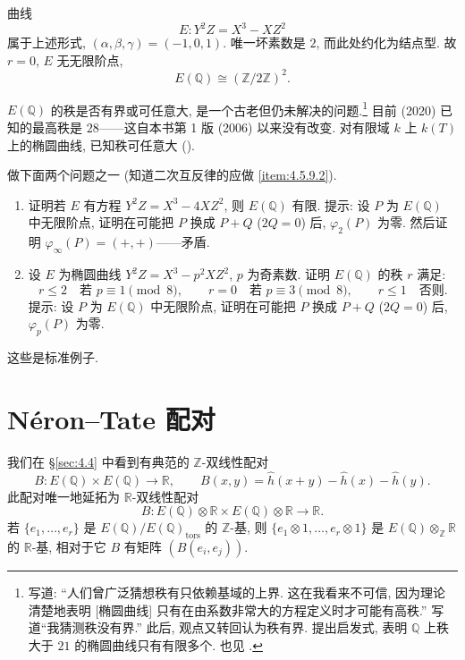 \begin{example} \label{thm:4.5.7} 
曲线
\[
E\colon Y^2Z = X^3 - XZ^2
\]
属于上述形式, $(\alpha, \beta, \gamma) = (-1, 0, 1)$. 唯一坏素数是 $2$, 而此处约化为结点型. 故 $r = 0$, $E$ 无无限阶点,
\[
E(\mathbb{Q})\cong(\mathbb{Z}/2\mathbb{Z})^2.
\]
\end{example}

\begin{aside} \label{thm:4.5.8} 
$E(\mathbb{Q})$ 的秩是否有界或可任意大, 是一个古老但仍未解决的问题.\footnote{\cite[p.~257]{cassels1966} 写道: ``人们曾广泛猜想秩有只依赖基域的上界. 这在我看来不可信, 因为理论清楚地表明 [椭圆曲线] 只有在由系数非常大的方程定义时才可能有高秩.'' \cite[p.~194]{tate1974} 写道``我猜测秩没有界.'' 此后, 观点又转回认为秩有界. \cite{park2019} 提出启发式, 表明 $\mathbb{Q}$ 上秩大于 $21$ 的椭圆曲线只有有限多个. 也见 \cite{poonen2018}.} 目前 (2020) 已知的最高秩是 $28$——这自本书第 1 版 (2006) 以来没有改变. 对有限域 $k$ 上 $k(T)$ 上的椭圆曲线, 已知秩可任意大 (\cite{tateshafarevich1967}).
\end{aside}

\begin{exercise} \label{thm:4.5.9} 
做下面两个问题之一 (知道二次互反律的应做 \hyperref[item:4.5.9.2]{\ref*{item:4.5.9.2}}).
\begin{enumerate}[label=\textup{(\arabic*)}]
\item 证明若 $E$ 有方程 $Y^2Z = X^3 - 4XZ^2$, 则 $E(\mathbb{Q})$ 有限. 提示: 设 $P$ 为 $E(\mathbb{Q})$ 中无限阶点, 证明在可能把 $P$ 换成 $P + Q$ ($2Q = 0$) 后, $\varphi_2(P)$ 为零. 然后证明 $\varphi_\infty(P) = (+,+)$——矛盾.
\item\label{item:4.5.9.2} 设 $E$ 为椭圆曲线 $Y^2Z = X^3 - p^2XZ^2$, $p$ 为奇素数. 证明 $E(\mathbb{Q})$ 的秩 $r$ 满足:
\[
r\le 2 \quad \text{若 } p\equiv 1\pmod{8}, \qquad r = 0 \quad \text{若 } p\equiv 3\pmod{8}, \qquad r\le 1 \quad \text{否则}.
\]
提示: 设 $P$ 为 $E(\mathbb{Q})$ 中无限阶点, 证明在可能把 $P$ 换成 $P + Q$ ($2Q = 0$) 后, $\varphi_p(P)$ 为零.
\end{enumerate}
这些是标准例子.
\end{exercise}

\section{N\'eron--Tate 配对}\label{sec:4.6}

我们在 \S\ref{sec:4.4} 中看到有典范的 $\mathbb{Z}$-双线性配对
\[
B\colon E(\mathbb{Q})\times E(\mathbb{Q})\to\mathbb{R}, \qquad
B(x, y) = \hat{h}(x+y) - \hat{h}(x) - \hat{h}(y).
\]
此配对唯一地延拓为 $\mathbb{R}$-双线性配对
\[
B\colon E(\mathbb{Q})\otimes\mathbb{R}\times E(\mathbb{Q})\otimes\mathbb{R}\to\mathbb{R}.
\]
若 $\{e_1, \dots, e_r\}$ 是 $E(\mathbb{Q})/E(\mathbb{Q})_{\mathrm{tors}}$ 的 $\mathbb{Z}$-基, 则 $\{e_1\otimes 1, \dots, e_r\otimes 1\}$ 是 $E(\mathbb{Q})\otimes_{\mathbb{Z}}\mathbb{R}$ 的 $\mathbb{R}$-基, 相对于它 $B$ 有矩阵 $(B(e_i, e_j))$.

